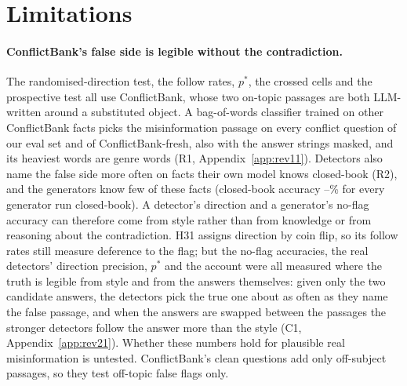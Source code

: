 \section*{Limitations}

\paragraph{ConflictBank's false side is legible without the contradiction.} The randomised-direction test, the follow rates,
$p^*$, the crossed cells and the prospective test all use ConflictBank, whose two on-topic passages are both
LLM-written around a substituted object. A bag-of-words classifier trained on other ConflictBank facts picks the
misinformation passage on every conflict question of our eval set and of ConflictBank-fresh, also with the answer
strings masked, and its
heaviest words are genre words (R1, Appendix~\ref{app:rev11}). Detectors also name the false side more often on facts
their own model knows closed-book (R2), and the generators know few of these facts (closed-book accuracy
\cbClosedMin--\cbClosedMax\% for every generator run closed-book). A detector's direction and a generator's no-flag accuracy can therefore come from
style rather than from knowledge or from reasoning about the contradiction. H31 assigns direction by coin flip, so its
follow rates still measure deference to the flag; but the no-flag accuracies, the real detectors' direction precision,
$p^*$ and the account were all measured where the truth is legible from style and from the answers themselves:
given only the two candidate answers, the detectors pick the true one about as often as they name the false passage,
and when the answers are swapped between the passages the stronger detectors follow the answer more than the style
(C1, Appendix~\ref{app:rev21}). Whether these numbers hold for plausible real misinformation is untested. ConflictBank's clean questions add only off-subject passages, so they test off-topic false
flags only.

